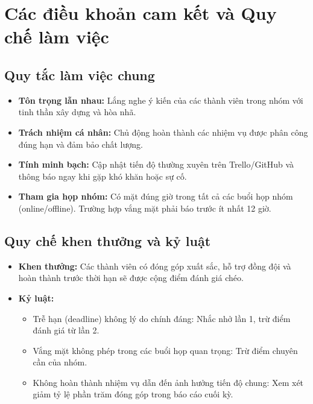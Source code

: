 \section{Các điều khoản cam kết và Quy chế làm việc}

\subsection{Quy tắc làm việc chung}
\begin{itemize}
    \item \textbf{Tôn trọng lẫn nhau:} Lắng nghe ý kiến của các thành viên trong nhóm với tinh thần xây dựng và hòa nhã.
    \item \textbf{Trách nhiệm cá nhân:} Chủ động hoàn thành các nhiệm vụ được phân công đúng hạn và đảm bảo chất lượng.
    \item \textbf{Tính minh bạch:} Cập nhật tiến độ thường xuyên trên Trello/GitHub và thông báo ngay khi gặp khó khăn hoặc sự cố.
    \item \textbf{Tham gia họp nhóm:} Có mặt đúng giờ trong tất cả các buổi họp nhóm (online/offline). Trường hợp vắng mặt phải báo trước ít nhất 12 giờ.
\end{itemize}

\subsection{Quy chế khen thưởng và kỷ luật}
\begin{itemize}
    \item \textbf{Khen thưởng:} Các thành viên có đóng góp xuất sắc, hỗ trợ đồng đội và hoàn thành trước thời hạn sẽ được cộng điểm đánh giá chéo.
    \item \textbf{Kỷ luật:}
    \begin{itemize}
        \item Trễ hạn (deadline) không lý do chính đáng: Nhắc nhở lần 1, trừ điểm đánh giá từ lần 2.
        \item Vắng mặt không phép trong các buổi họp quan trọng: Trừ điểm chuyên cần của nhóm.
        \item Không hoàn thành nhiệm vụ dẫn đến ảnh hưởng tiến độ chung: Xem xét giảm tỷ lệ phần trăm đóng góp trong báo cáo cuối kỳ.
    \end{itemize}
\end{itemize}
